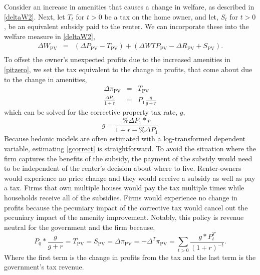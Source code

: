 \documentclass[ecta,nameyear,draft]{econsocart}
\theoremstyle{plain}
\theoremstyle{remark}
\begin{document}
Consider an increase in amenities that causes a change in welfare, as described in \ref{deltaW2}. Next, let $T_t$ for $t>0$ be a tax on the home owner, and let, $S_t$ for $t>0$, be an equivalent subsidy paid to the renter. We can incorporate these into the welfare measure in \ref{deltaW2},
\begin{eqnarray*}
	\Delta W_{\mathrm{PV}}&=& \left(\Delta P_{\mathrm{PV}}-T_{\mathrm{PV}}\right)+\left(\Delta\mathit{WTP}_\mathrm{PV}-\Delta R_{\mathrm{PV}}+S_{\mathrm{PV}}\right).\nonumber\\
\end{eqnarray*}
To offset the owner's unexpected profits due to the increased amenities in \ref{pitzero}, we set the tax equivalent to the change in profits, that come about due to the change in amenities,
\begin{eqnarray*}
 \Delta \pi_{\mathrm{PV}}&=&T_{\mathrm{PV}}\\
\frac{\Delta P_1}{1+r}&=&P_1\frac{g}{g+r}
\end{eqnarray*}
which can be solved for the corrective property tax rate, $g$,
\begin{equation}
	g=\frac{\% \Delta P_1*r}{1+r-\% \Delta P_1} \label{gcorrect}
\end{equation}
Because hedonic models are often estimated with a log-transformed dependent variable, estimating \ref{gcorrect} is straightforward. To avoid the situation where the firm captures the benefits of the subsidy, the payment of the subsidy would need to be independent of the renter's decision about where to live. Renter-owners would experience no price change and they would receive a subsidy as well as pay a tax. Firms that own multiple houses would pay the tax multiple times while households receive all of the subsidies. Firms would experience no change in profits because the pecuniary impact of the corrective tax would cancel out the pecuniary impact of the amenity improvement.
Notably, this policy is revenue neutral for the government and the firm because, 
\begin{equation}
	P_0*\frac{g}{g+r}=T_{\mathrm{PV}}=S_{\mathrm{PV}}=\Delta \pi_{\mathrm{PV}}=-\Delta^T \pi_{\mathrm{PV}}=\sum_{t>0}\frac{g*P_t^T}{(1+r)^{-t}}.
\end{equation}
Where the first term is the change in profits from the tax and the last term is the government's tax revenue. 

 
\end{document}
